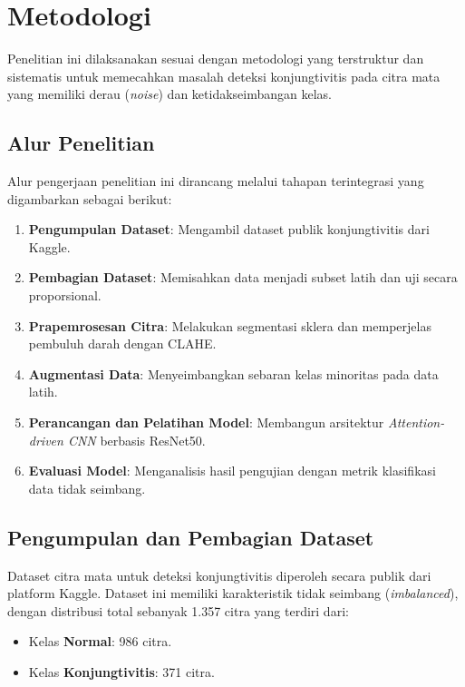 \chapter{Metodologi}
\label{chap:metodologi}


Penelitian ini dilaksanakan sesuai dengan metodologi yang terstruktur dan sistematis untuk memecahkan masalah deteksi konjungtivitis pada citra mata yang memiliki derau (\textit{noise}) dan ketidakseimbangan kelas.

\section{Alur Penelitian}
\label{sec:alur-penelitian}

Alur pengerjaan penelitian ini dirancang melalui tahapan terintegrasi yang digambarkan sebagai berikut:
\begin{enumerate}
  \item \textbf{Pengumpulan Dataset}: Mengambil dataset publik konjungtivitis dari Kaggle.
  \item \textbf{Pembagian Dataset}: Memisahkan data menjadi subset latih dan uji secara proporsional.
  \item \textbf{Prapemrosesan Citra}: Melakukan segmentasi sklera dan memperjelas pembuluh darah dengan CLAHE.
  \item \textbf{Augmentasi Data}: Menyeimbangkan sebaran kelas minoritas pada data latih.
  \item \textbf{Perancangan dan Pelatihan Model}: Membangun arsitektur \textit{Attention-driven CNN} berbasis ResNet50.
  \item \textbf{Evaluasi Model}: Menganalisis hasil pengujian dengan metrik klasifikasi data tidak seimbang.
\end{enumerate}

\section{Pengumpulan dan Pembagian Dataset}
\label{sec:pengumpulan-dataset}

Dataset citra mata untuk deteksi konjungtivitis diperoleh secara publik dari platform Kaggle. Dataset ini memiliki karakteristik tidak seimbang (\textit{imbalanced}), dengan distribusi total sebanyak 1.357 citra yang terdiri dari:
\begin{itemize}
  \item Kelas \textbf{Normal}: 986 citra.
  \item Kelas \textbf{Konjungtivitis}: 371 citra.
\end{itemize}

